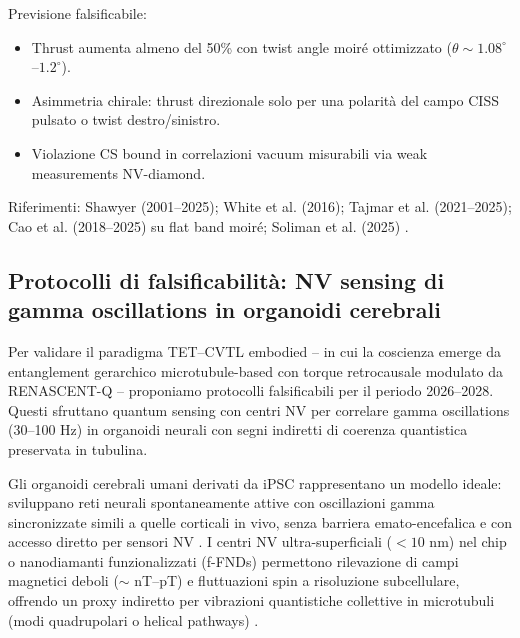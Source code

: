 \documentclass[11pt,a4paper]{article}
\let\oldcite\cite
\renewcommand{\cite}{\protect\oldcite}
\theoremstyle{plain}
\theoremstyle{definition}
\begin{document}
Previsione falsificabile:
\begin{itemize}
    \item Thrust aumenta almeno del 50\% con twist angle moiré ottimizzato ($\theta \sim 1.08^\circ$--$1.2^\circ$).
    \item Asimmetria chirale: thrust direzionale solo per una polarità del campo CISS pulsato o twist destro/sinistro.
    \item Violazione CS bound in correlazioni vacuum misurabili via weak measurements NV-diamond.
\end{itemize}

Riferimenti: Shawyer (2001--2025); White et al. (2016); Tajmar et al. (2021--2025); Cao et al. (2018--2025) su flat band moiré; Soliman et al. (2025) \cite{Soliman2025vacuumtorque}.















\vspace{0.4cm}







\subsection{Protocolli di falsificabilità: NV sensing di gamma oscillations in organoidi cerebrali}
\label{subsec:falsifiability-nv-gamma}

Per validare il paradigma TET–CVTL embodied -- in cui la coscienza emerge da entanglement gerarchico microtubule-based con torque retrocausale modulato da RENASCENT-Q -- proponiamo protocolli falsificabili per il periodo 2026–2028. Questi sfruttano quantum sensing con centri NV per correlare gamma oscillations (30–100 Hz) in organoidi neurali con segni indiretti di coerenza quantistica preservata in tubulina.

\vspace{0.2cm}

Gli organoidi cerebrali umani derivati da iPSC rappresentano un modello ideale: sviluppano reti neurali spontaneamente attive con oscillazioni gamma sincronizzate simili a quelle corticali in vivo, senza barriera emato-encefalica e con accesso diretto per sensori NV \cite{Hu2024, Wang2025, Trujillo2024}. I centri NV ultra-superficiali ($<10$ nm) nel chip o nanodiamanti funzionalizzati (f-FNDs) permettono rilevazione di campi magnetici deboli ($\sim$ nT–pT) e fluttuazioni spin a risoluzione subcellulare, offrendo un proxy indiretto per vibrazioni quantistiche collettive in microtubuli (modi quadrupolari o helical pathways) \cite{Costa2024, Price2020, Niora2026}.
\end{document}
